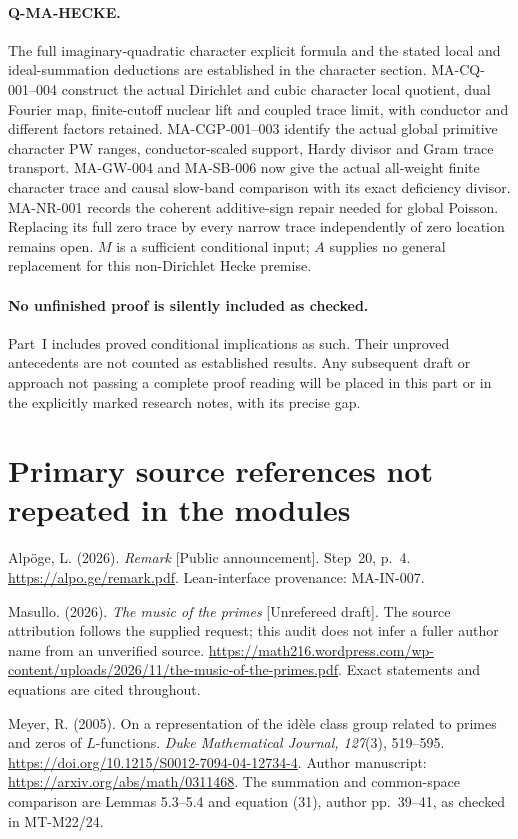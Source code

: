 \documentclass[11pt,a4paper]{article}
\begin{document}
\paragraph{Q-MA-HECKE.}
The full imaginary-quadratic character explicit formula and
the stated local and ideal-summation deductions are established
in the character section. MA-CQ-001--004 construct the actual
Dirichlet and cubic character local quotient, dual Fourier map,
finite-cutoff nuclear lift and coupled trace limit, with
conductor and different factors retained. MA-CGP-001--003
identify the actual global primitive character PW ranges,
conductor-scaled support, Hardy divisor and Gram trace transport.
MA-GW-004 and MA-SB-006 now give the actual all-weight finite
character trace and causal slow-band comparison with its exact
deficiency divisor. MA-NR-001 records the coherent additive-sign
repair needed for global Poisson. Replacing its full zero trace by every
narrow trace independently of zero location remains open.
$M$ is a sufficient conditional input; $A$ supplies no general
replacement for this non-Dirichlet Hecke premise.

\paragraph{No unfinished proof is silently included as checked.}
Part~I includes proved conditional implications as such. Their
unproved antecedents are not counted as established results.
Any subsequent draft or approach not passing a complete proof
reading will be placed in this part or in the explicitly marked
research notes, with its precise gap.

\section{Primary source references not repeated in the modules}
Alp\"oge, L. (2026). \emph{Remark} [Public announcement].
Step~20, p.~4. \url{https://alpo.ge/remark.pdf}.
Lean-interface provenance: MA-IN-007.

Masullo. (2026). \emph{The music of the primes} [Unrefereed draft].
The source attribution follows the supplied request; this audit
does not infer a fuller author name from an unverified source.
\url{https://math216.wordpress.com/wp-content/uploads/2026/11/the-music-of-the-primes.pdf}.
Exact statements and equations are cited throughout.

Meyer, R. (2005). On a representation of the id\`ele class group
related to primes and zeros of $L$-functions.
\emph{Duke Mathematical Journal, 127}(3), 519--595.
\url{https://doi.org/10.1215/S0012-7094-04-12734-4}.
Author manuscript: \url{https://arxiv.org/abs/math/0311468}.
The summation and common-space comparison are Lemmas 5.3--5.4
and equation (31), author pp.~39--41, as checked in MT-M22/24.
\end{document}
